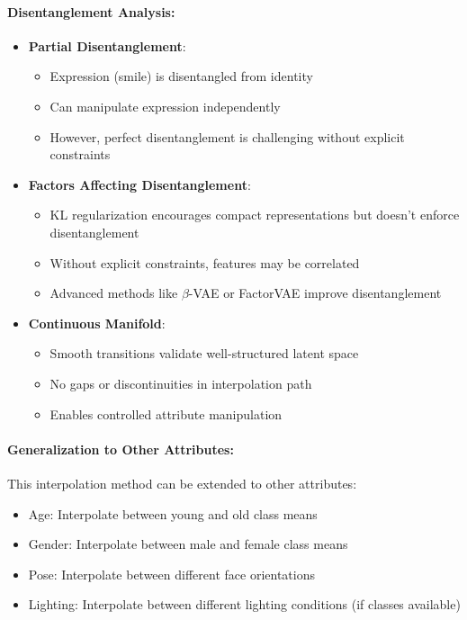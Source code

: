 \documentclass[conference]{IEEEtran}
\begin{document}
\paragraph{Disentanglement Analysis:}
\begin{itemize}
    \item \textbf{Partial Disentanglement}: 
    \begin{itemize}
        \item Expression (smile) is disentangled from identity
        \item Can manipulate expression independently
        \item However, perfect disentanglement is challenging without explicit constraints
    \end{itemize}
    
    \item \textbf{Factors Affecting Disentanglement}:
    \begin{itemize}
        \item KL regularization encourages compact representations but doesn't enforce disentanglement
        \item Without explicit constraints, features may be correlated
        \item Advanced methods like $\beta$-VAE or FactorVAE improve disentanglement
    \end{itemize}
    
    \item \textbf{Continuous Manifold}:
    \begin{itemize}
        \item Smooth transitions validate well-structured latent space
        \item No gaps or discontinuities in interpolation path
        \item Enables controlled attribute manipulation
    \end{itemize}
\end{itemize}

\paragraph{Generalization to Other Attributes:}
This interpolation method can be extended to other attributes:
\begin{itemize}
    \item Age: Interpolate between young and old class means
    \item Gender: Interpolate between male and female class means
    \item Pose: Interpolate between different face orientations
    \item Lighting: Interpolate between different lighting conditions (if classes available)
\end{itemize}
\end{document}
